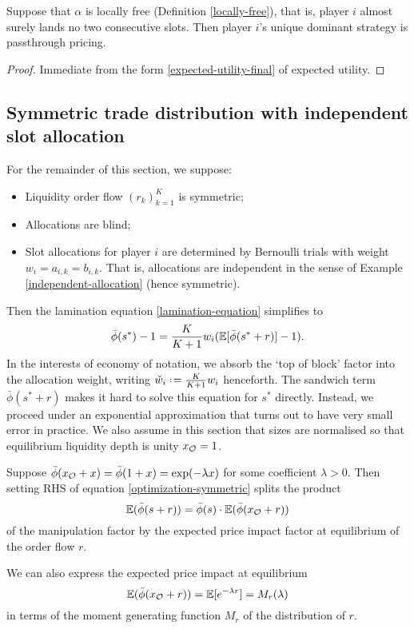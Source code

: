 \begin{corollary} \label{dominant-strategy-passthrough}

  Suppose that $\alpha$ is locally free (Definition \ref{locally-free}), that is, player $i$ almost surely lands no two consecutive slots.
  Then player $i$'s unique dominant strategy is passthrough pricing.

\end{corollary}
%
\begin{proof}

  Immediate from the form \eqref{expected-utility-final} of expected utility. \qedhere

\end{proof}

\subsection{Symmetric trade distribution with independent slot allocation}

For the remainder of this section, we suppose:
\begin{itemize}
  \item Liquidity order flow $(r_k)_{k=1}^K$ is symmetric;
  \item Allocations are blind;
  \item Slot allocations for player $i$ are determined by Bernoulli trials with weight $w_i=a_{i,k}=b_{i,k}$. That is, allocations are independent in the sense of Example \ref{independent-allocation} (hence symmetric).
\end{itemize}
Then the lamination equation \eqref{lamination-equation} simplifies to
\begin{equation}
  \bar\phi({s^*}) - 1 = \frac{K}{K+1} w_i(\mathbb{E}[\bar\phi({s^*}+r)]- 1). \label{optimization-symmetric}
\end{equation}
In the interests of economy of notation, we absorb the `top of block' factor into the allocation weight, writing $\check{w}_i\defeq \frac{K}{K+1} w_i$ henceforth.
%
The sandwich term $\bar\phi(s^*+r)$ makes it hard to solve this equation for ${s^*}$ directly.
%
Instead, we proceed under an exponential approximation that turns out to have very small error in practice.
%
We also assume in this section that sizes are normalised so that equilibrium liquidity depth is unity $x_{\mathcal{O}}=1$.

\begin{definition}

  Suppose $\bar\phi(x_{\mathcal{O}} + x)=\bar\phi(1+x)=\exp(-\lambda x)$ for some coefficient $\lambda>0$.
  Then setting RHS of equation \eqref{optimization-symmetric} splits the product 
  \[
    \mathbb{E}(\bar\phi(s+r)) = \bar\phi(s)\cdot \mathbb{E}(\bar\phi(x_{\mathcal{O}} + r))
  \]
  of the manipulation factor by the expected price impact factor at equilibrium of the order flow $r$.

  We can also express the expected price impact at equilibrium
  \[
    \mathbb{E}(\bar\phi(x_{\mathcal{O}} + r)) = \mathbb{E}[e^{-\lambda r}] = M_r(\lambda)
  \]
  in terms of the moment generating function $M_r$ of the distribution of $r$.

\end{definition}

